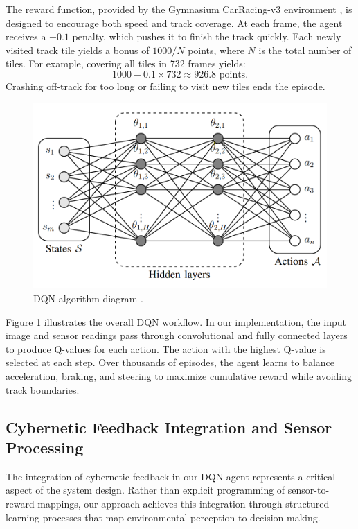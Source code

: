 The reward function, provided by the Gymnasium CarRacing-v3 environment \cite{gymnasium2023}, is designed to encourage both speed and track coverage. At each frame, the agent receives a \(-0.1\) penalty, which pushes it to finish the track quickly. Each newly visited track tile yields a bonus of \(1000/N\) points, where \(N\) is the total number of tiles. For example, covering all tiles in 732 frames yields:
\[
    1000 - 0.1 \times 732 \approx 926.8 \text{ points}.
\]
Crashing off-track for too long or failing to visit new tiles ends the episode.

\begin{figure}[h]
    \centering
    \includegraphics[width=0.8\linewidth]{images/DQNmodel.png}
    \caption{DQN algorithm diagram \cite{DQNimage}.}
    \label{fig:dqn_diagram}
\end{figure}

Figure \ref{fig:dqn_diagram} illustrates the overall DQN workflow. In our implementation, the input image and sensor readings pass through convolutional and fully connected layers to produce Q-values for each action. The action with the highest Q-value is selected at each step. Over thousands of episodes, the agent learns to balance acceleration, braking, and steering to maximize cumulative reward while avoiding track boundaries.

\subsection{Cybernetic Feedback Integration and Sensor Processing}

The integration of cybernetic feedback in our DQN agent represents a critical aspect of the system design. Rather than explicit programming of sensor-to-reward mappings, our approach achieves this integration through structured learning processes that map environmental perception to decision-making.

